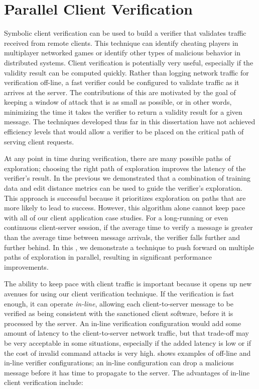 
\chapter{Parallel Client Verification}
\label{ch:par}
Symbolic client verification can be used to build a verifier that
validates traffic received from remote clients. This technique can
identify cheating players in multiplayer networked games or identify other types of
malicious behavior in distributed systems. Client verification is
potentially very useful, especially if the validity result can be
computed quickly. Rather than  logging network traffic for
verification off-line, a fast verifier could be configured  to
validate traffic as it arrives at the server. The contributions of
this \paper are motivated by the goal of keeping a  window of attack
that is as small as possible, or in other words, minimizing the time
it takes the verifier to return a validity result for a given message.
The techniques developed thus far in this dissertation
have not achieved efficiency levels that would allow a
verifier to be placed on the critical path of serving client requests. 

At any point in time during verification, there are many possible
paths of exploration; choosing the right path of exploration improves
the latency of the verifier's result. In the previous \paper we
demonstrated that a combination of training data and edit distance
metrics can be used to guide the verifier's exploration. This approach
is successful because it prioritizes exploration on paths that are
more likely to lead to success. However, this algorithm alone cannot
keep pace with all of our client application case studies. For a
long-running or even continuous client-server session, if the average
time to verify a message is greater than the average time between
message arrivals, the verifier falls further and further behind.
In this \paper, we demonstrate a technique to push forward on multiple
paths of exploration in parallel, resulting in significant performance
improvements. 

The ability to keep pace with client traffic is important because it
opens up new avenues for using our client verification technique. If
the verification is fast enough, it can operate \emph{in-line},
allowing each client-to-server message to be verified as being
consistent with the sanctioned client software, before it is processed
by the server. An in-line verification configuration would add some
amount of latency to the client-to-server network traffic, but that
trade-off may be very acceptable in some situations, especially if the
added latency is low or if the cost of invalid command attacks is very
high.  shows examples of off-line and
in-line verifier configurations; an in-line configuration
can drop a malicious message before it has time to propagate to
the server. The advantages of in-line client verification include:

